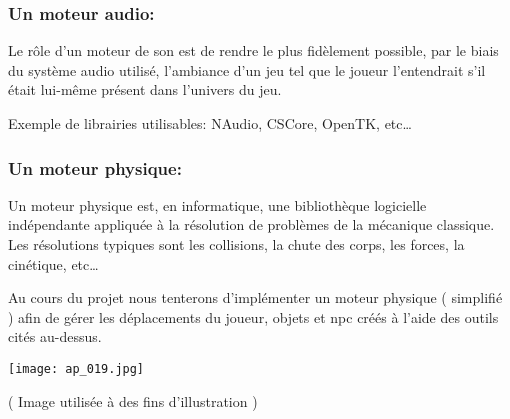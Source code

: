 \documentclass[french, 12pt]{article}
\begin{document}
    \color{black}\begin{flushleft}
        
        \subsubsection{Un moteur audio:}
        \vspace*{1mm}

        Le rôle d'un moteur de son est de rendre le plus fidèlement possible, par le biais du système audio utilisé, l'ambiance d'un jeu tel que le joueur l'entendrait s'il était lui-même présent dans l'univers du jeu.\newline

        Exemple de librairies utilisables: NAudio, CSCore, OpenTK, etc…
    
        \subsubsection{Un moteur physique:}
        \vspace*{1mm}
        Un moteur physique est, en informatique, une bibliothèque logicielle indépendante appliquée à la résolution de problèmes de la mécanique classique. Les résolutions typiques sont les collisions, la chute des corps, les forces, la cinétique, etc…\newline

        Au cours du projet nous tenterons d’implémenter un moteur physique ( simplifié ) afin de gérer les déplacements du joueur, objets et npc créés à l’aide des outils cités au-dessus.\newline

        
    \end{flushleft}
    \begin{center}
            \texttt{[image: ap\_019.jpg]}
            
            \tiny\color{gray}( Image utilisée à des fins d’illustration )
    \end{center}
    \newpage


\end{document}
